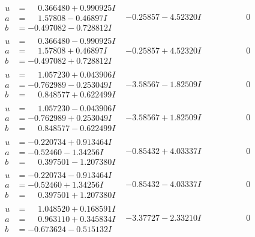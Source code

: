 \documentclass[1p]{elsarticle_modified}
\theoremstyle{definition}
\begin{document}
$$\begin{array}{c|c|c}
\begin{aligned}
u &= \phantom{-}0.366480 + 0.990925 I \\
a &= \phantom{-}1.57808 - 0.46897 I \\
b &= -0.497082 - 0.728812 I\end{aligned}
 & -0.25857 - 4.52320 I & \phantom{-0.000000 } 0 \\ \hline\begin{aligned}
u &= \phantom{-}0.366480 - 0.990925 I \\
a &= \phantom{-}1.57808 + 0.46897 I \\
b &= -0.497082 + 0.728812 I\end{aligned}
 & -0.25857 + 4.52320 I & \phantom{-0.000000 } 0 \\ \hline\begin{aligned}
u &= \phantom{-}1.057230 + 0.043906 I \\
a &= -0.762989 - 0.253049 I \\
b &= \phantom{-}0.848577 + 0.622499 I\end{aligned}
 & -3.58567 - 1.82509 I & \phantom{-0.000000 } 0 \\ \hline\begin{aligned}
u &= \phantom{-}1.057230 - 0.043906 I \\
a &= -0.762989 + 0.253049 I \\
b &= \phantom{-}0.848577 - 0.622499 I\end{aligned}
 & -3.58567 + 1.82509 I & \phantom{-0.000000 } 0 \\ \hline\begin{aligned}
u &= -0.220734 + 0.913464 I \\
a &= -0.52460 - 1.34256 I \\
b &= \phantom{-}0.397501 - 1.207380 I\end{aligned}
 & -0.85432 + 4.03337 I & \phantom{-0.000000 } 0 \\ \hline\begin{aligned}
u &= -0.220734 - 0.913464 I \\
a &= -0.52460 + 1.34256 I \\
b &= \phantom{-}0.397501 + 1.207380 I\end{aligned}
 & -0.85432 - 4.03337 I & \phantom{-0.000000 } 0 \\ \hline\begin{aligned}
u &= \phantom{-}1.048520 + 0.168591 I \\
a &= \phantom{-}0.963110 + 0.345834 I \\
b &= -0.673624 - 0.515132 I\end{aligned}
 & -3.37727 - 2.33210 I & \phantom{-0.000000 } 0 \\ \hline\begin{aligned}

\end{aligned}
\end{array}$$
\end{document}
